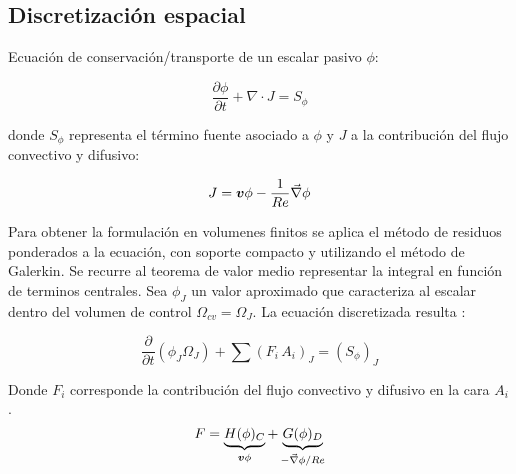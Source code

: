 
\subsection{Discretización espacial}

Ecuación de conservación/transporte de un escalar pasivo $\phi$:

\begin{equation} \label{transporte}
\dfrac{\partial \phi}{\partial t} + \nabla \cdot J = S_{\phi}
\end{equation}

donde $S_{\phi}$ representa el término fuente asociado a $\phi$ y $J$ a la contribución del flujo convectivo y difusivo:

\begin{equation}
J = \boldsymbol{v} \phi - \dfrac{1}{Re} \vec{\nabla} \phi
\end{equation}

Para obtener la formulación en volumenes finitos se aplica el método de residuos ponderados a la ecuación, con soporte compacto y utilizando el método de Galerkin. Se recurre al teorema de valor medio representar la integral en función de terminos centrales. Sea $\phi_J$ un valor aproximado que caracteriza al escalar dentro del volumen de control $\Omega_{cv} = \Omega_J$. La ecuación discretizada resulta \cite{ferz}:

\begin{equation}
\dfrac{\partial}{\partial t} \left( \phi_J \Omega_J \right) + \sum \left( F_i \, A_i \right)_J = \left( S_{\phi} \right)_J
\end{equation} 

Donde $F_i$ corresponde la contribución del flujo convectivo y difusivo en la cara $A_i$.
\begin{equation}
F = \underbrace{H(\phi)_C}_{\boldsymbol{v} \phi} + \underbrace{G(\phi)_D}_{-\vec{\nabla} \phi / Re}
\end{equation}



	

